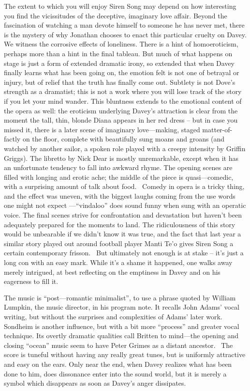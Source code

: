 The extent to which you will enjoy Siren Song may depend on how interesting you find the vicissitudes of the deceptive, imaginary love affair. Beyond the fascination of watching a man devote himself to someone he has never met, there is the mystery of why Jonathan chooses to enact this particular cruelty on Davey. We witness the corrosive effects of loneliness. There is a hint of homoeroticism, perhaps more than a hint in the final tableau. But much of what happens on stage is just a form of extended dramatic irony, so extended that when Davey finally learns what has been going on, the emotion felt is not one of betrayal or injury, but of relief that the truth has finally come out. Subtlety is not Dove’s strength as a dramatist; this is not a work where you will lose track of the story if you let your mind wander. This bluntness extends to the emotional content of the opera as well: the eroticism underlying Davey’s attraction is clear from the moment the tall, thin, blonde Diana appears in her red dress – but in case you missed it, there is a later scene of imaginary love—making, staged matter-of-factly on the floor, complete with beautifully sung moans and groans (and watched by another sailor, a spoken role played with a creepy intensity by Griffin Griggs). The libretto by Nick Dear is mostly unremarkable, except when it has an unfortunate tendency to fall into awkward rhyme. The opening scenes are filled with longing and erotic ache; the middle of the piece is quasi—comedic, with a surprising amount of talk about food.  Comedy in opera is a tricky thing, and the effect was uneven, with the biggest laughs coming from the use words one might not expect —“vindaloo” does sound funny when sung with an operatic voice. The final scenes strive for confrontation and devastation but haven’t been adequately prepared for the moments to land. The ridiculousness of this story would be unbearable if we didn’t know it was true, and the fact that last year a similar story played out around football player Manti Te’o gives Siren Song a certain contemporary frisson.  But ultimately not enough is at stake – it’s just a long con with an easy mark. While it’s a shame it happened, one walks away merely intrigued, at best reflecting on the emptiness in Davey and on his eagerness to fill it.

The music is “post—romantic minimalist”, to use a phrase quoted by William Lumpkin, the music director, in his program note. It recalls John Adams’ vocal writing, but without the surprises and complexities of Adams’ later work. Sondheim is another influence, but with a bit more “process” and greater vocal technique. Its overtly dramatic qualities call Britten to mind—the opening and closing “ocean” music seem to have Peter Grimes as a distant ancestor.  The score is tuneful without having any really great tunes, but is uniformly attractive and easy on the ears. Only near the end, when Davey realizes what has been done to him, does dissonance enter into the sound world, but it is merely a symbol which disappears as soon as Davey’s anger dissipates.

